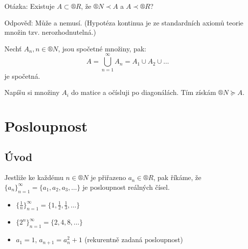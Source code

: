 \documentclass[12pt]{article}					%
\begin{document}
        \begin{poznamka}
            Otázka: Existuje $A \subset ®R$, že $®N \prec A$ a $A \prec ®R$?

            Odpověď: Může a nemusí. (Hypotéza kontinua je ze standardních axiomů teorie množin tzv. nerozhodnutelná.)
        \end{poznamka}

        \begin{tvrzeni}
            Nechť $A_n, n \in ®N$, jsou spočetné množiny, pak:
            $$ A = \bigcup_{n=1}^∞ A_n = A_1\cup A_2\cup … $$
            je spočetná.
            \begin{dukazin}
                Napíšu si množiny $A_i$ do matice a očísluji po diagonálách. Tím získám $®N \succeq A$.
            \end{dukazin}
        \end{tvrzeni}

\section{Posloupnost}
    \subsection{Úvod}
        \begin{definice}
            Jestliže ke každému $n \in ®N$ je přiřazeno $a_n \in ®R$, pak říkáme, že $\{a_n\}_{n=1}^∞ = \{a_1, a_2, a_3, …\}$ je posloupnost reálných čísel.
            \begin{prikladyin}
                \begin{itemize}
                    \item $\{\frac{1}{n}\}_{n = 1}^∞ = \{1, \frac{1}{2}, \frac{1}{3}, …\}$
                    \item $\{2^n\}_{n=1}^∞ = \{2, 4, 8, …\}$
                    \item $a_1 = 1$, $a_{n+1} = a_n^2 + 1$ (rekurentně zadaná posloupnost)
                \end{itemize}
            \end{prikladyin}
        \end{definice}
\end{document}

